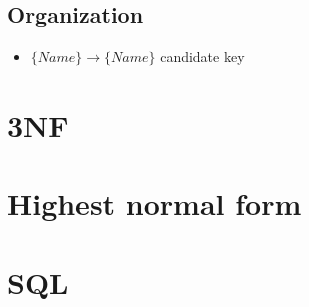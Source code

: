 \subsection*{Organization}
\begin{itemize}
\item{$\{Name\} \rightarrow \{Name\}$ candidate key}
\end{itemize}

\section{3NF}

\section{Highest normal form}

\section{SQL}